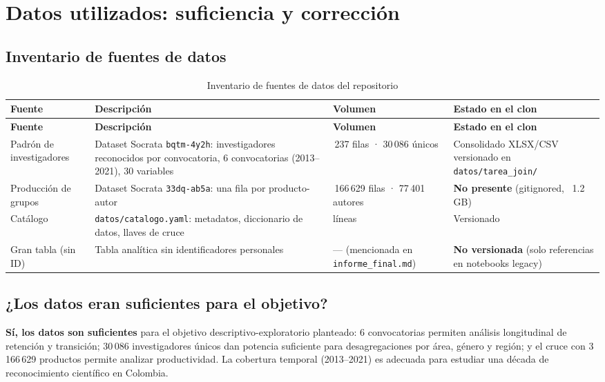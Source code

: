 
\section{Datos utilizados: suficiencia y corrección}

\subsection{Inventario de fuentes de datos}

\begingroup
\small
\setlength{\tabcolsep}{3pt}
\begin{longtable}{>{\raggedright\arraybackslash}p{3.0cm}>{\raggedright\arraybackslash}p{4.9cm}>{\raggedright\arraybackslash}p{4.1cm}>{\raggedright\arraybackslash}p{2.6cm}}
\caption{Inventario de fuentes de datos del repositorio}
\label{tab:fuentes}\\
\toprule
\textbf{Fuente} & \textbf{Descripción} & \textbf{Volumen} & \textbf{Estado en el clon} \\
\midrule
\endfirsthead
\toprule
\textbf{Fuente} & \textbf{Descripción} & \textbf{Volumen} & \textbf{Estado en el clon} \\
\midrule
\endhead
Padrón de investigadores & Dataset Socrata \texttt{bqtm-4y2h}: investigadores reconocidos por convocatoria, 6 convocatorias (2013--2021), 30 variables &
77\,237 filas · 30\,086 únicos &
Consolidado XLSX/CSV versionado en \texttt{datos/tarea\_join/} \\
Producción de grupos & Dataset Socrata \texttt{33dq-ab5a}: una fila por producto-autor &
3\,166\,629 filas · 77\,401 autores &
\textbf{No presente} (gitignored, ~1.2\,GB) \\
Catálogo & \texttt{datos/catalogo.yaml}: metadatos, diccionario de datos, llaves de cruce &
308 líneas &
Versionado \\
Gran tabla (sin ID) & Tabla analítica sin identificadores personales &
— (mencionada en \texttt{informe\_final.md}) &
\textbf{No versionada} (solo referencias en notebooks legacy) \\
\bottomrule
\end{longtable}
\endgroup

\subsection{¿Los datos eran suficientes para el objetivo?}

\begin{tcolorbox}[hallazgo]
\textbf{Sí, los datos son suficientes} para el objetivo descriptivo-exploratorio
planteado: 6 convocatorias permiten análisis longitudinal de retención y
transición; 30\,086 investigadores únicos dan potencia suficiente para
desagregaciones por área, género y región; y el cruce con 3\,166\,629 productos
permite analizar productividad. La cobertura temporal (2013--2021) es adecuada
para estudiar una década de reconocimiento científico en Colombia.
\end{tcolorbox}

